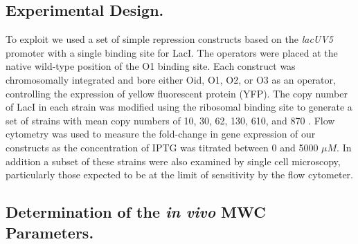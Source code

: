 \pagebreak
\subsection*{Experimental Design.} 



To exploit \eref[eq7] we used a set of simple repression constructs based on the \textit{lacUV5} promoter with a single binding site for LacI. The operators were placed at the native wild-type position of the O1 binding site. Each construct was chromosomally integrated and bore either Oid, O1, O2, or O3 as an operator, controlling the expression of yellow fluorescent protein (YFP). The copy number of LacI in each strain was modified using the ribosomal binding site to generate a set of strains with mean copy numbers of 10, 30, 62, 130, 610, and 870 \cite{Garcia2011}. Flow cytometry was used to measure the fold-change in gene expression of our constructs as the concentration of IPTG was titrated between 0 and 5000 $\mu M$. In addition a subset of these strains were also examined by single cell microscopy, particularly those expected to be at the limit of sensitivity by the flow cytometer.

\subsection*{Determination of the \textit{in vivo} MWC Parameters.}

